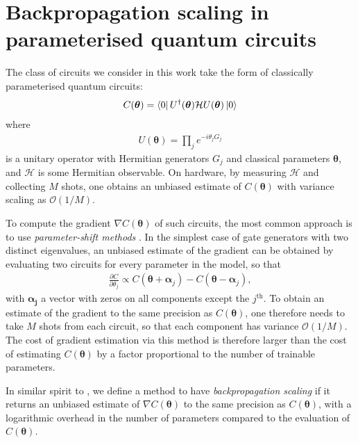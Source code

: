 \documentclass[a4paper,twocolumn,11pt]{quantumarticle}
\renewcommand{\vec}{\boldsymbol}
\begin{document}
\section{Backpropagation scaling in parameterised quantum circuits}
The class of circuits we consider in this work take the form of classically parameterised quantum circuits:
%
\begin{align}\label{pqc}
    C(\vec{\theta}) = \bra{0}U^\dagger(\vec{\theta})\mathcal{H}U(\vec{\theta})\ket{0}
\end{align}
%
where 
%
\begin{align}
U(\vec{\theta})=\prod_j e^{-i\theta_jG_j}
\end{align}
%
is a unitary operator with Hermitian generators $G_j$ and classical parameters $\vec{\theta}$, and $\mathcal{H}$ is some Hermitian observable. On hardware, by measuring $\mathcal{H}$ and collecting $M$ shots, one obtains an unbiased estimate of $C(\vec{\theta})$ with variance scaling as $\mathcal{O}(1/M)$. 

To compute the gradient $\nabla C(\vec{\theta})$ of such circuits, the most common approach is to use \emph{parameter-shift methods} \cite{PS0, PS1, PS2, PS3, PS4, PS5}. In the simplest case of gate generators with two distinct eigenvalues, an unbiased estimate of the gradient can be obtained by evaluating two circuits for every parameter in the model, so that 
\begin{align}
\frac{\partial C}{\partial \theta_j}\propto C(\vec{\theta}+\vec{\alpha}_j)-C(\vec{\theta}-\vec{\alpha}_j),
\end{align}
with $\vec{\alpha_j}$ a vector with zeros on all components except the $j^{\text{th}}$. To obtain an estimate of the gradient to the same precision as $C(\vec{\theta})$, one therefore needs to take $M$ shots from each circuit, so that each component has variance  $\mathcal{O}(1/M)$. The cost of gradient estimation via this method is therefore larger than the cost of estimating $C(\vec{\theta})$ by a factor proportional to the number of trainable parameters. 

In similar spirit to \cite{abbas2023quantum}, we define a method to have \emph{backpropagation scaling} if it returns an unbiased estimate of $\nabla C(\vec{\theta})$ to the same precision as $C(\vec{\theta})$, 
with a logarithmic overhead in the number of parameters compared to the evaluation of $C(\vec{\theta})$. 
\end{document}
